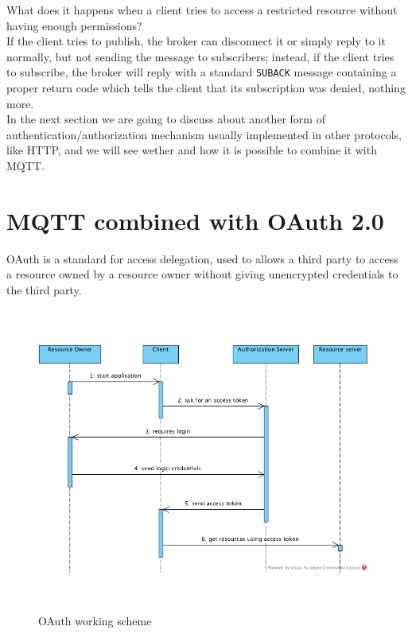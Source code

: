 \documentclass[12pt]{report}
\begin{document}
{What does it happens when a client tries to access a restricted resource without having enough permissions?\\

If the client tries to publish, the broker can disconnect it or simply reply to it normally, but not sending the message to subscribers; instead, if the client tries to subscribe, the broker will reply with a standard \texttt{SUBACK} message containing a proper return code which tells the client that its subscription was denied, nothing more.\\

In the next section we are going to discuss about another form of authentication/authorization mechanism usually implemented in other protocols, like HTTP, and we will see wether and how it is possible to combine it with MQTT. 

\section{MQTT combined with OAuth 2.0}
\bigskip
OAuth is a standard for access delegation, used to allows a third party to access a resource owned by a resource owner without giving unencrypted credentials to the third party.

\begin{figure}[H]
\includegraphics[width=11cm,height=10cm,keepaspectratio]{oauth_scheme}
\centering
\caption{OAuth working scheme}
\end{figure}

}
\end{document}
